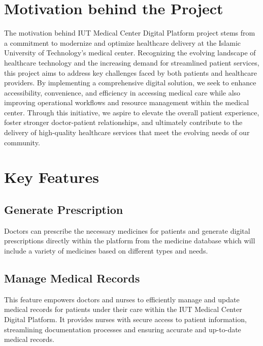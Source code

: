 \documentclass[11.5pt]{article}
\begin{document}
	
	
	\section{Motivation behind the Project}
	
	The motivation behind IUT Medical Center Digital Platform project stems from a commitment to modernize and optimize healthcare delivery at the Islamic University of Technology's medical center. Recognizing the evolving landscape of healthcare technology and the increasing demand for streamlined patient services, this project aims to address key challenges faced by both patients and healthcare providers. By implementing a comprehensive digital solution, we seek to enhance accessibility, convenience, and efficiency in accessing medical care while also improving operational workflows and resource management within the medical center. Through this initiative, we aspire to elevate the overall patient experience, foster stronger doctor-patient relationships, and ultimately contribute to the delivery of high-quality healthcare services that meet the evolving needs of our community.

	
	
	
	
	\section{Key Features}
	
		
	\subsection{Generate Prescription}
	
	Doctors can prescribe the necessary medicines for patients and generate digital prescriptions directly within the platform from the medicine database which will include a variety of medicines based on different types and needs.
	
	\subsection{Manage Medical Records}
	
	This feature empowers doctors and nurses to efficiently manage and update medical records for patients under their care within the IUT Medical Center Digital Platform. It provides nurses with secure access to patient information, streamlining documentation processes and ensuring accurate and up-to-date medical records.
	
\end{document}
